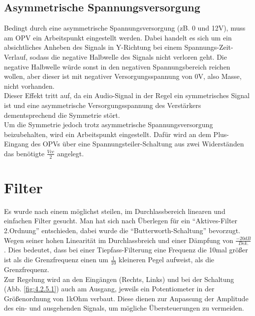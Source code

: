 \subsection{Asymmetrische Spannungsversorgung}\label{subsec3.2.5}
Bedingt durch eine asymmetrische Spannungsversorgung (zB. 0 und 12V), muss am OPV ein Arbeitspunkt eingestellt werden. Dabei handelt es sich um ein absichtliches Anheben des Signals in Y-Richtung bei einem Spannungs-Zeit-Verlauf, sodass die negative Halbwelle des Signals nicht verloren geht. Die negative Halbwelle würde sonst in den negativen Spannungsbereich reichen wollen, aber dieser ist mit negativer Versorgungsspannung von 0V, also Masse, nicht vorhanden.\\
Dieser Effekt tritt auf, da ein Audio-Signal in der Regel ein symmetrisches Signal ist und eine asymmetrische Versorgungsspannung des Verstärkers dementsprechend die Symmetrie stört.\\
Um die Symmetrie jedoch trotz asymmetrische Spannungsversorgung beizubehalten, wird ein Arbeitspunkt eingestellt. Dafür wird an dem Plus-Eingang des OPVs über eine Spannungsteiler-Schaltung aus zwei Widerständen das benötigte $\frac{Vcc}{2}$ angelegt.


\section{Filter}\label{sec:3.3}
Es wurde nach einem möglichst steilen, im Durchlassbereich linearen und einfachen Filter gesucht. Man hat sich nach Überlegen für ein \enquote{Aktives-Filter 2.Ordnung} entschieden, dabei wurde die \enquote{Butterworth-Schaltung} bevorzugt. Wegen seiner hohen Linearität im Durchlassbreich und einer Dämpfung von $\frac{-20dB}{Dek.}$ . Dies bedeutet, dass bei einer Tiepfass-Filterung eine Frequenz die 10mal größer ist als die Grenzfrequenz einen um $\frac{1}{10}$ kleineren Pegel aufweist, als die Grenzfrequenz.\\
Zur Regelung wird an den Eingängen (Rechts, Links) und bei der Schaltung (Abb. \ref{fig:4.2.5.1}) auch am Ausgang, jeweils ein Potentiometer in der Größenordnung von 1kOhm verbaut. Diese dienen zur Anpassung der Amplitude des ein- und ausgehenden Signals, um mögliche Übersteuerungen zu vermeiden.


